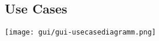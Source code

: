 \documentclass{scrartcl}
\begin{document}
\subsection{Use Cases}
\texttt{[image: gui/gui-usecasediagramm.png]}
\newpage

\end{document}
